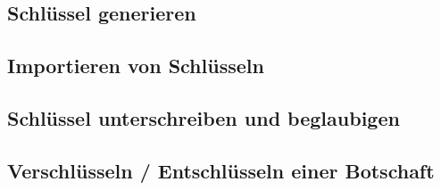 \subsection{Schlüssel generieren}

\subsection{Importieren von Schlüsseln}

\subsection{Schlüssel unterschreiben und beglaubigen}

\subsection{Verschlüsseln / Entschlüsseln einer Botschaft}

